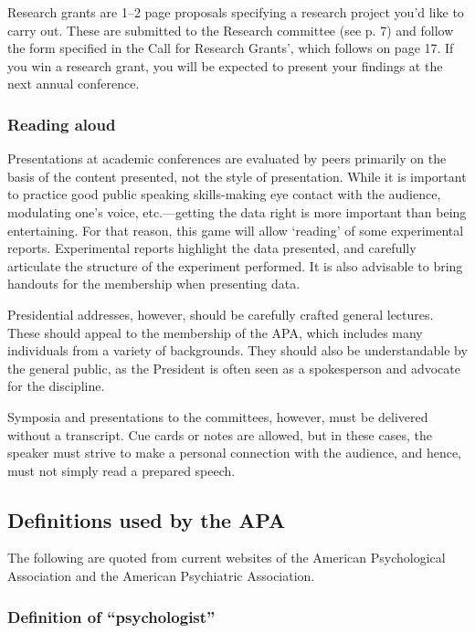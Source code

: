 Research grants are 1--2 page proposals specifying a research project you'd like to carry out. These are submitted to the Research committee (see p. 7) and follow the form specified in the Call for Research Grants', which follows on page 17. If you win a research grant, you will be expected to present your findings at the next annual conference.

\subsubsection{Reading aloud}
\label{readingaloud}

Presentations at academic conferences are evaluated by peers primarily on the basis of the content presented, not the style of presentation. While it is important to practice good public speaking skills-making eye contact with the audience, modulating one's voice, etc.---getting the data right is more important than being entertaining. For that reason, this game will allow `reading' of some experimental reports. Experimental reports highlight the data presented, and carefully articulate the structure of the experiment performed. It is also advisable to bring handouts for the membership when presenting data.

Presidential addresses, however, should be carefully crafted general lectures. These should appeal to the membership of the APA, which includes many individuals from a variety of backgrounds. They should also be understandable by the general public, as the President is often seen as a spokesperson and advocate for the discipline.

Symposia and presentations to the committees, however, must be delivered without a transcript. Cue cards or notes are allowed, but in these cases, the speaker must strive to make a personal connection with the audience, and hence, must not simply read a prepared speech.

\subsection{Definitions used by the APA}
\label{definitionsusedbytheapa}

The following are quoted from current websites of the American Psychological Association and the American Psychiatric Association.

\subsubsection{Definition of ``psychologist''}
\label{definitionofpsychologist}

